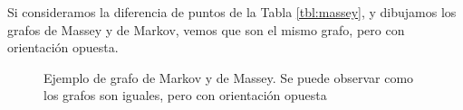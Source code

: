 \begin{ejemplo}
Si consideramos la diferencia de puntos de la Tabla \ref{tbl:massey}, y dibujamos los grafos de Massey y de Markov, vemos que son el mismo grafo, pero con orientación opuesta.

\begin{figure}[htb]
\centering
{}
\caption[Ejemplo de grafo de Markov y de Massey]{Ejemplo de grafo de Markov y de Massey. Se puede observar como los grafos son iguales, pero con orientación opuesta}
\label{fig:grafo_massey_markov}
\end{figure}
\end{ejemplo}


